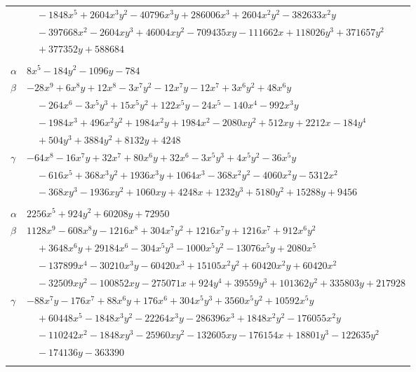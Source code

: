 \documentclass[11pt]{article}
\begin{document}
\begin{longtable}{@{}ll@{}}
 & $\quad -1848x^{5}+2604x^{3}y^{2}-40796x^{3}y+286006x^{3}+2604x^{2}y^{2}-382633x^{2}y$\\
 & $\quad -397668x^{2}-2604xy^{3}+46004xy^{2}-709435xy-111662x+118026y^{3}+371657y^{2}$\\
 & $\quad +377352y+588684$\\
\addlinespace[3pt]
\multicolumn{2}{@{}l}{$\{i,j\}=\{19,33\}$, $k_{ij}=2^{4}\cdot 11$}\\
$\alpha$ & $8x^{5}-184y^{2}-1096y-784$\\
$\beta$ & $-28x^{9}+6x^{8}y+12x^{8}-3x^{7}y^{2}-12x^{7}y-12x^{7}+3x^{6}y^{2}+48x^{6}y$\\
 & $\quad -264x^{6}-3x^{5}y^{3}+15x^{5}y^{2}+122x^{5}y-24x^{5}-140x^{4}-992x^{3}y$\\
 & $\quad -1984x^{3}+496x^{2}y^{2}+1984x^{2}y+1984x^{2}-2080xy^{2}+512xy+2212x-184y^{4}$\\
 & $\quad +504y^{3}+3884y^{2}+8132y+4248$\\
$\gamma$ & $-64x^{8}-16x^{7}y+32x^{7}+80x^{6}y+32x^{6}-3x^{5}y^{3}+4x^{5}y^{2}-36x^{5}y$\\
 & $\quad -616x^{5}+368x^{3}y^{2}+1936x^{3}y+1064x^{3}-368x^{2}y^{2}-4060x^{2}y-5312x^{2}$\\
 & $\quad -368xy^{3}-1936xy^{2}+1060xy+4248x+1232y^{3}+5180y^{2}+15288y+9456$\\
\addlinespace[3pt]
\multicolumn{2}{@{}l}{$\{i,j\}=\{19,38\}$, $k_{ij}=2^{2}\cdot 11^{2}$}\\
$\alpha$ & $2256x^{5}+924y^{2}+60208y+72950$\\
$\beta$ & $1128x^{9}-608x^{8}y-1216x^{8}+304x^{7}y^{2}+1216x^{7}y+1216x^{7}+912x^{6}y^{2}$\\
 & $\quad +3648x^{6}y+29184x^{6}-304x^{5}y^{3}-1000x^{5}y^{2}-13076x^{5}y+2080x^{5}$\\
 & $\quad -137899x^{4}-30210x^{3}y-60420x^{3}+15105x^{2}y^{2}+60420x^{2}y+60420x^{2}$\\
 & $\quad -32509xy^{2}-100852xy-275071x+924y^{4}+39559y^{3}+101362y^{2}+335803y+217928$\\
$\gamma$ & $-88x^{7}y-176x^{7}+88x^{6}y+176x^{6}+304x^{5}y^{3}+3560x^{5}y^{2}+10592x^{5}y$\\
 & $\quad +60448x^{5}-1848x^{3}y^{2}-22264x^{3}y-286396x^{3}+1848x^{2}y^{2}-176055x^{2}y$\\
 & $\quad -110242x^{2}-1848xy^{3}-25960xy^{2}-132605xy-176154x+18801y^{3}-122635y^{2}$\\
 & $\quad -174136y-363390$\\
\addlinespace[3pt]

\end{longtable}
\end{document}
